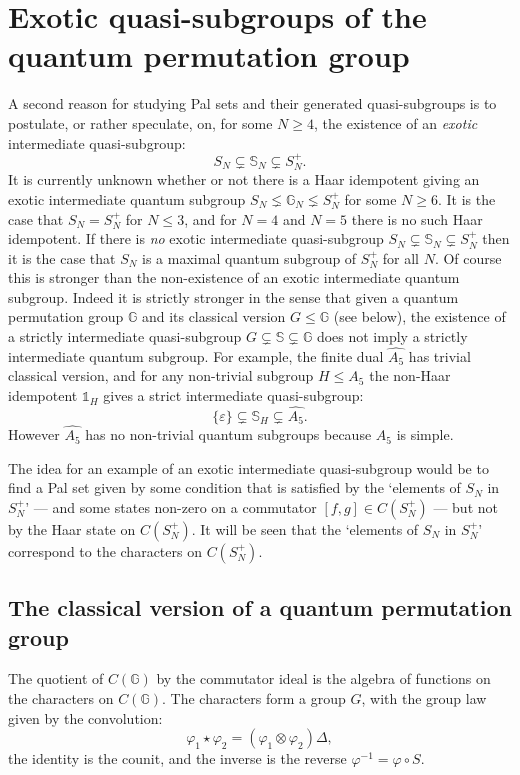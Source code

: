\documentclass[12pt]{amsart}
\theoremstyle{remark}
\theoremstyle{remark}
\begin{document}
\section{Exotic quasi-subgroups of the quantum permutation group\label{exotic}}
A second reason for studying Pal sets and their generated quasi-subgroups is to postulate, or rather speculate, on, for some $N\geq 4$, the existence of an \emph{exotic} intermediate quasi-subgroup:
$$S_N\subsetneq \mathbb{S}_N\subsetneq S_N^+.$$
It is currently unknown whether or not there is a Haar idempotent giving an exotic intermediate quantum subgroup $S_N\lneq \mathbb{G}_N\lneq S_N^+$ for some  $N\geq 6$. It is the case that $S_N=S_N^+$ for $N\leq 3$, and for $N=4$ \cite{bb3} and $N=5$ \cite{ban} there is no such Haar idempotent. If there is \emph{no} exotic intermediate quasi-subgroup $S_N\subsetneq \mathbb{S}_N \subsetneq S_N^+$ then it is the case that $S_N$ is a maximal quantum subgroup of $S_N^+$ for all $N$. Of course this is stronger than the non-existence of an exotic intermediate quantum subgroup. Indeed it is strictly stronger in the sense that given a quantum permutation group $\mathbb{G}$ and its classical version $G\leq \mathbb{G}$ (see below), the existence of a strictly intermediate quasi-subgroup $G\subsetneq \mathbb{S}\subsetneq \mathbb{G}$ does not imply a strictly intermediate quantum subgroup. For example, the finite dual $\widehat{A_5}$ has trivial classical version, and for any non-trivial subgroup $H\leq A_5$ the non-Haar idempotent $\mathds{1}_{H}$ gives a strict intermediate quasi-subgroup:
$$\{\varepsilon\}\subsetneq \mathbb{S}_H\subsetneq \widehat{A_5}.$$
However $\widehat{A_5}$ has no non-trivial quantum subgroups because $A_5$ is simple.

\bigskip

The idea for an example of an exotic intermediate quasi-subgroup would be to find a Pal set given by some condition that is satisfied by the `elements of $S_N$ in $S_N^+$' --- and some states non-zero on a commutator $[f,g]\in C(S_N^+)$ --- but not by the Haar state on $C(S_N^+)$. It will be seen that the `elements of $S_N$ in $S_N^+$' correspond to the characters on $C(S_N^+)$.
\subsection{The classical version of a quantum permutation group}
 The quotient of $C(\mathbb{G})$ by the commutator ideal is the algebra of functions on the characters on $C(\mathbb{G})$. The characters form a group $G$, with the group law given by the convolution:
$$\varphi_1\star \varphi_2=(\varphi_1\otimes\varphi_2)\Delta,$$
the identity is the counit, and the inverse is the reverse $\varphi^{-1}=\varphi\circ S$.
\end{document}

